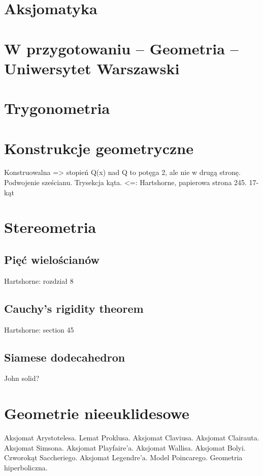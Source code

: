 \documentclass{greaseproof}
\begin{document}


\section{Aksjomatyka}


\section{W przygotowaniu -- Geometria -- Uniwersytet Warszawski}





\section{Trygonometria}


\section{Konstrukcje geometryczne}



Konstruowalna => stopień Q(x) nad Q to potęga 2, ale nie w drugą stronę.
Podwojenie sześcianu.
Trysekcja kąta.
<=: Hartshorne, papierowa strona 245.
17-kąt

\section{Stereometria}
\subsection{Pięć wielościanów}
Hartshorne: rozdział 8

\subsection{Cauchy's rigidity theorem}
Hartshorne: section 45

\subsection{Siamese dodecahedron}
John solid?


\section{Geometrie nieeuklidesowe}
Aksjomat Arystotelesa.
Lemat Proklusa.
Aksjomat Claviusa.
Aksjomat Clairauta.
Aksjomat Simsona.
Aksjomat Playfaire'a.
Aksjomat Wallisa.
Aksjomat Bolyi.
Czworokąt Saccheriego.
Aksjomat Legendre'a.
Model Poincarego.
Geometria hiperboliczna.
\end{document}
